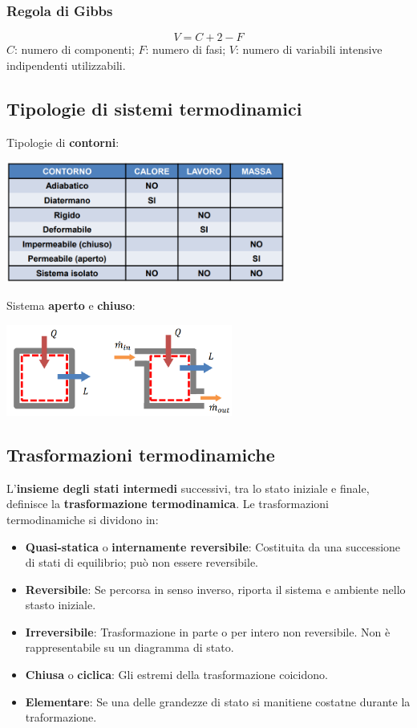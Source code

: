 \subsubsection{Regola di Gibbs}
\[
    V = C+2-F
\]
$C$: numero di componenti;\newline
$F$: numero di fasi;\newline
$V$: numero di variabili intensive indipendenti utilizzabili.
\subsection{Tipologie di sistemi termodinamici}
Tipologie di \textbf{contorni}:
\begin{center}
    \includegraphics[height=4cm]{../L01/img2.PNG}
\end{center}
Sistema \textbf{aperto} e \textbf{chiuso}:
\begin{center}
    \includegraphics[height=3cm]{../L01/img3.PNG}
\end{center}
\subsection{Trasformazioni termodinamiche}
L’\textbf{insieme degli stati intermedi} successivi, tra lo stato iniziale e finale, definisce la \textbf{trasformazione termodinamica}.\newline
\newline
Le trasformazioni termodinamiche si dividono in:
\begin{itemize}
    \item \textbf{Quasi-statica} o \textbf{internamente reversibile}: Costituita da una successione di stati di equilibrio; può non essere reversibile.
    \item \textbf{Reversibile}: Se percorsa in senso inverso, riporta il sistema e ambiente nello stasto iniziale.
    \item \textbf{Irreversibile}: Trasformazione in parte o per intero non reversibile. Non è rappresentabile su un diagramma di stato.
    \item \textbf{Chiusa} o \textbf{ciclica}: Gli estremi della trasformazione coicidono.
    \item \textbf{Elementare}: Se una delle grandezze di stato si manitiene costatne durante la traformazione.
\end{itemize}
